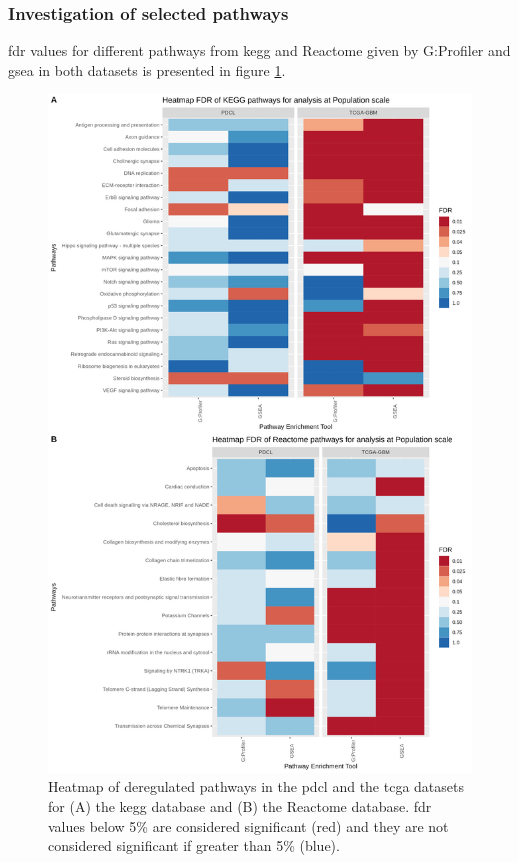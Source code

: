 \subsubsection{Investigation of selected pathways}

\acrshort{fdr} values for different pathways from \acrshort{kegg} and Reactome given by G:Profiler and \acrshort{gsea} in both datasets is presented in figure \ref*{supp:heatmap-fdr-global}.
\begin{figure}
    \begin{center}
        \includegraphics[height=0.7\paperheight]{img/heatmap-fdr-global}
        \caption{
            Heatmap of deregulated pathways in the \acrshort{pdcl} and the \acrshort{tcga} datasets for (A) the \acrshort{kegg} database and (B) the Reactome database.
            \acrshort{fdr} values below 5\% are considered significant (red) and they are not considered significant if greater than 5\% (blue).
        }
        \label{supp:heatmap-fdr-global}
    \end{center}
\end{figure}
